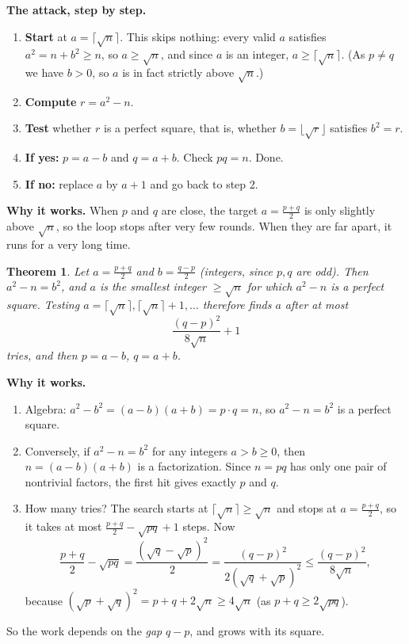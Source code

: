 \documentclass[11pt]{article}
\newtheorem{theorem}{Theorem}
\begin{document}
\textbf{The attack, step by step.}
\begin{enumerate}[nosep]
\item \textbf{Start} at $a=\lceil\sqrt n\rceil$. This skips nothing: every valid $a$ satisfies $a^2=n+b^2\ge n$, so $a\ge\sqrt n$, and since $a$ is an integer, $a\ge\lceil\sqrt n\rceil$. (As $p\ne q$ we have $b>0$, so $a$ is in fact strictly above $\sqrt n$.)
\item \textbf{Compute} $r=a^2-n$.
\item \textbf{Test} whether $r$ is a perfect square, that is, whether $b=\lfloor\sqrt r\rfloor$ satisfies $b^2=r$.
\item \textbf{If yes:} $p=a-b$ and $q=a+b$. Check $pq=n$. Done.
\item \textbf{If no:} replace $a$ by $a+1$ and go back to step 2.
\end{enumerate}
\textbf{Why it works.} When $p$ and $q$ are close, the target $a=\tfrac{p+q}{2}$ is only slightly above $\sqrt n$, so the loop stops after very few rounds. When they are far apart, it runs for a very long time.

\begin{theorem}
Let $a=\tfrac{p+q}{2}$ and $b=\tfrac{q-p}{2}$ (integers, since $p,q$ are odd). Then $a^2-n=b^2$, and $a$ is the smallest integer $\ge\sqrt n$ for which $a^2-n$ is a perfect square. Testing $a=\lceil\sqrt n\rceil,\lceil\sqrt n\rceil+1,\dots$ therefore finds $a$ after at most
\[
\frac{(q-p)^2}{8\sqrt n}+1
\]
tries, and then $p=a-b$, $q=a+b$.
\end{theorem}

\textbf{Why it works.}
\begin{enumerate}[nosep]
\item Algebra: $a^2-b^2=(a-b)(a+b)=p\cdot q=n$, so $a^2-n=b^2$ is a perfect square.
\item Conversely, if $a^2-n=b^2$ for any integers $a>b\ge0$, then $n=(a-b)(a+b)$ is a factorization. Since $n=pq$ has only one pair of nontrivial factors, the first hit gives exactly $p$ and $q$.
\item How many tries? The search starts at $\lceil\sqrt n\rceil\ge\sqrt n$ and stops at $a=\tfrac{p+q}{2}$, so it takes at most $\tfrac{p+q}{2}-\sqrt{pq}+1$ steps. Now
\[
\frac{p+q}{2}-\sqrt{pq}=\frac{(\sqrt q-\sqrt p)^2}{2}=\frac{(q-p)^2}{2(\sqrt q+\sqrt p)^2}\le\frac{(q-p)^2}{8\sqrt n},
\]
because $(\sqrt p+\sqrt q)^2=p+q+2\sqrt n\ge4\sqrt n$ (as $p+q\ge2\sqrt{pq}$).
\end{enumerate}
So the work depends on the \emph{gap} $q-p$, and grows with its square.
\end{document}
